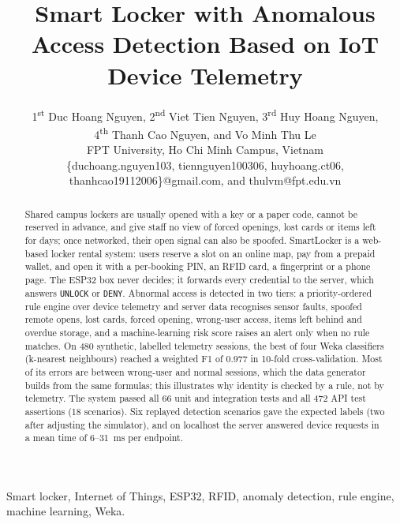\documentclass[conference, onecolumn]{IEEEtran}
\begin{document}
\title{Smart Locker with Anomalous Access Detection Based on IoT Device Telemetry}

\author{
1\textsuperscript{st} Duc Hoang Nguyen, 2\textsuperscript{nd} Viet Tien Nguyen, 3\textsuperscript{rd} Huy Hoang Nguyen,\\ 4\textsuperscript{th} Thanh Cao Nguyen, and Vo Minh Thu Le\\
FPT University, Ho Chi Minh Campus, Vietnam\\
\{duchoang.nguyen103, tiennguyen100306, huyhoang.ct06, thanhcao19112006\}@gmail.com, and thulvm@fpt.edu.vn}
\maketitle

\begin{abstract}
Shared campus lockers are usually opened with a key or a paper code, cannot be reserved in advance, and give staff no
view of forced openings, lost cards or items left for days; once networked, their open signal can also be spoofed.
SmartLocker is a web-based locker rental system: users reserve a slot on an online map, pay from a prepaid wallet, and
open it with a per-booking PIN, an RFID card, a fingerprint or a phone page. The ESP32 box never decides; it forwards
every credential to the server, which answers \texttt{UNLOCK} or \texttt{DENY}. Abnormal access is detected in two
tiers: a priority-ordered rule engine over device telemetry and server data recognises sensor faults, spoofed remote
opens, lost cards, forced opening, wrong-user access, items left behind and overdue storage, and a machine-learning risk
score raises an alert only when no rule matches. On 480 synthetic, labelled telemetry sessions, the best of four Weka
classifiers (k-nearest neighbours) reached a weighted F1 of 0.977 in 10-fold cross-validation. Most of its errors are
between wrong-user and normal sessions, which the data generator builds from the same formulas; this illustrates why
identity is checked by a rule, not by telemetry. The system passed all 66 unit and integration tests and all 472 API
test assertions (18 scenarios). Six replayed detection scenarios gave the expected labels (two after
adjusting the simulator), and on localhost the server answered device requests in a mean time of 6--31~ms per endpoint.
\end{abstract}

\begin{IEEEkeywords}
Smart locker, Internet of Things, ESP32, RFID, anomaly detection, rule engine, machine learning, Weka.
\end{IEEEkeywords}
\end{document}
